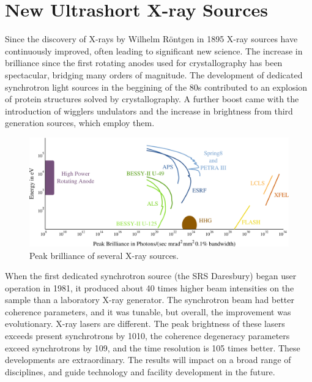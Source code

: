 \chapter{New Ultrashort X-ray Sources}\label{Ultrashort X-ray Sources}\noindent
 
Since the discovery of X-rays by Wilhelm R\"{o}ntgen in 1895 X-ray sources have
continuously improved, often leading to significant new science. The increase in
brilliance since the first rotating anodes used for crystallography has been
spectacular, bridging many orders of magnitude. The development of dedicated
synchrotron light sources in the beggining of the 80s contributed to an explosion of
protein structures solved by crystallography. A further boost came with
the introduction of wigglers undulators and the increase in brightness from
third generation sources, which employ them.

 
\begin{figure}[h]
\centering
  \includegraphics[width=1.0 \columnwidth]{brilliance.png}
  \caption{Peak brilliance of several X-ray sources.}
  \label{Fig:Brilliance}
\end{figure}

When the first dedicated synchrotron source (the SRS Daresbury) began user operation in 1981, it produced about 40 times higher beam intensities on the sample than a laboratory X-ray generator. The synchrotron beam had better coherence parameters, and it was tunable, but overall, the improvement was evolutionary. X-ray lasers are different. The peak brightness of these lasers exceeds present synchrotrons by 1010, the coherence degeneracy parameters exceed synchrotrons by 109, and the time resolution is 105 times better. These developments are extraordinary. The results will impact on a broad range of disciplines, and guide technology and facility development in the future.
 
